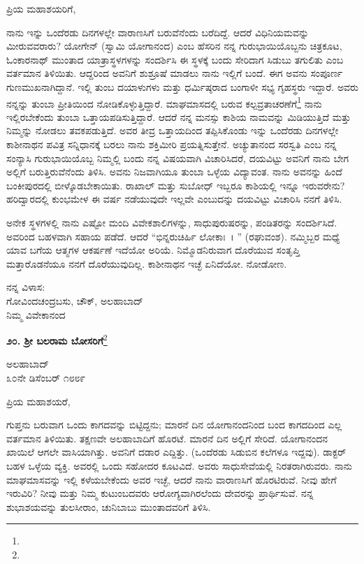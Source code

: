 \noindent
ಪ್ರಿಯ ಮಹಾಶಯರಿಗೆ,

ನಾನು ಇನ್ನು ಒಂದೆರಡು ದಿನಗಳಲ್ಲೇ ವಾರಾಣಸಿಗೆ ಬರುವೆನೆಂದು ಬರೆದಿದ್ದೆ. ಆದರೆ ವಿಧಿನಿಯಮವನ್ನು ಮೀರುವವರಾರು? ಯೋಗೇನ್ (ಸ್ವಾಮಿ ಯೋಗಾನಂದ) ಎಂಬ ಹೆಸರಿನ ನನ್ನ ಗುರುಭಾಯಿಯೊಬ್ಬನು ಚಿತ್ರಕೂಟ, ಓಂಕಾರನಾಥ್ ಮುಂತಾದ ಯಾತ್ರಾಸ್ಥಳಗಳನ್ನು ಸಂದರ್ಶಿಸಿ ಈ ಸ್ಥಳಕ್ಕೆ ಬಂದು ಸೇರಿದಾಗ ಸಿಡುಬು ತಗುಲಿತು ಎಂಬ ವರ್ತಮಾನ ತಿಳಿಯಿತು. ಆದ್ದರಿಂದ ಅವನಿಗೆ ಶುಶ್ರೂಷೆ ಮಾಡಲು ನಾನು ಇಲ್ಲಿಗೆ ಬಂದೆ. ಈಗ ಅವನು ಸಂಪೂರ್ಣ ಗುಣಮುಖನಾಗಿದ್ದಾನೆ. ಇಲ್ಲಿ ತುಂಬ ದಯಾಳುಗಳು ಮತ್ತು ಧರ್ಮಿಷ್ಠರಾದ ಬಂಗಾಳೀ ಸಭ್ಯ ಗೃಹಸ್ಥರು ಇದ್ದಾರೆ. ಅವರು ನನ್ನನ್ನು ತುಂಬಾ ಪ್ರೀತಿಯಿಂದ ನೋಡಿಕೊಳ್ಳುತ್ತಿದ್ದಾರೆ. ಮಾಘಮಾಸದಲ್ಲಿ ಬರುವ ಕಲ್ಪವ್ರತಾಚರಣೆಗೆ\footnote{} ನಾನು ಇಲ್ಲಿರಬೇಕೆಂದು ತುಂಬಾ ಒತ್ತಾಯಪಡಿಸುತ್ತಿದ್ದಾರೆ. ಆದರೆ ನನ್ನ ಮನಸ್ಸು ಕಾಶಿಯ ನಾಮವನ್ನು ಮಿಡಿಯುತ್ತಿದೆ ಮತ್ತು ನಿಮ್ಮನ್ನು ನೋಡಲು ತವಕಪಡುತ್ತಿದೆ. ಅವರ ತೀವ್ರ ಒತ್ತಾಯದಿಂದ ತಪ್ಪಿಸಿಕೊಂಡು ಇನ್ನು ಒಂದೆರಡು ದಿನಗಳಲ್ಲೇ ಕಾಶೀನಾಥನ ಪವಿತ್ರ ಸನ್ನಿಧಾನಕ್ಕೆ ಬರಲು ನಾನು ಶಕ್ತಿಮೀರಿ ಪ್ರಯತ್ನಿಸುತ್ತೇನೆ. ಅಚ್ಯುತಾನಂದ ಸರಸ್ವತಿ ಎಂಬ ನನ್ನ ಸಂನ್ಯಾಸಿ ಗುರುಭಾಯಿಯೊಬ್ಬ ನಿಮ್ಮಲ್ಲಿ ಬಂದು ನನ್ನ ವಿಷಯವಾಗಿ ವಿಚಾರಿಸಿದರೆ, ದಯವಿಟ್ಟು ಅವನಿಗೆ ನಾನು ಬೇಗ ಅಲ್ಲಿಗೆ ಬರುತ್ತಿರುವೆನೆಂದು ತಿಳಿಸಿ. ಅವನು ನಿಜವಾಗಿಯೂ ತುಂಬಾ ಒಳ್ಳೆಯ ವಿದ್ಯಾವಂತ. ನಾನು ಅವನನ್ನು ಹಿಂದೆ ಬಂಕೀಪುರದಲ್ಲಿ ಬೀಳ್ಕೊಡಬೇಕಾಯಿತು. ರಾಖಾಲ್ ಮತ್ತು ಸುಬೋಧ್ ಇಬ್ಬರೂ ಕಾಶಿಯಲ್ಲಿ ಇನ್ನೂ ಇರುವರೇನು?ಹರಿದ್ವಾರದಲ್ಲಿ ಕುಂಭಮೇಳ ಈ ವರ್ಷ ನಡೆಯುವುದೇ ಇಲ್ಲವೇ ಎಂಬುದನ್ನು ದಯವಿಟ್ಟು ವಿಚಾರಿಸಿ ನನಗೆ ತಿಳಿಸಿ.

ಅನೇಕ ಸ್ಥಳಗಳಲ್ಲಿ ನಾನು ಎಷ್ಟೋ ಮಂದಿ ವಿವೇಕಶಾಲಿಗಳನ್ನು, ಸಾಧುಪುರುಷರನ್ನು, ಪಂಡಿತರನ್ನು ಸಂದರ್ಶಿಸಿದೆ. ಅವರಿಂದ ಬಹಳವಾಗಿ ಸಹಾಯ ಪಡೆದೆ. ಆದರೆ “ಭಿನ್ನರುಚಿರ್ಹಿ ಲೋಕಾಃ~। ” (ರಘುವಂಶ). ನಮ್ಮಿಬ್ಬರ ಮಧ್ಯೆ ಯಾವ ಬಗೆಯ ಆತ್ಮಗಳ ಆಕರ್ಷಣೆ ಇದೆಯೋ ಅರಿಯೆ. ನಿಮ್ಮೊಡನಿರುವಾಗ ದೊರೆಯುವ ಸಂತೃಪ್ತಿ ಮತ್ತಾರೊಡನೆಯೂ ನನಗೆ ದೊರೆಯುವುದಿಲ್ಲ. ಕಾಶೀನಾಥನ ಇಚ್ಛೆ ಏನಿದೆಯೋ. ನೋಡೋಣ.

\vspace{-0.3cm}

{\flushright
ನನ್ನ ವಿಳಾಸ:\\ ಗೋವಿಂದಚಂದ್ರಬಸು, ಚೌಕ್, ಅಲಹಾಬಾದ್\\ನಿಮ್ಮ ವಿವೇಕಾನಂದ\par}

\begin{center}
\textbf{೨೦. ಶ‍್ರೀ ಬಲರಾಮ ಬೋಸರಿಗೆ}\footnote{}
\end{center}

\vspace{-0.5cm}

\begin{flushright}
ಅಲಹಾಬಾದ್\\೩೦ನೇ ಡಿಸೆಂಬರ್ ೧೮೮೯
\end{flushright}

\noindent
ಪ್ರಿಯ ಮಹಾಶಯರೆ,

ಗುಪ್ತನು ಬರುವಾಗ ಒಂದು ಕಾಗದವನ್ನು ಬಿಟ್ಟಿದ್ದನು; ಮಾರನೆ ದಿನ ಯೋಗಾನಂದನಿಂದ ಬಂದ ಕಾಗದದಿಂದ ಎಲ್ಲ ವರ್ತಮಾನ ತಿಳಿಯಿತು. ತಕ್ಷಣವೇ ಅಲಹಾಬಾದಿಗೆ ಹೊರಟೆ. ಮಾರನೆ ದಿನ ಅಲ್ಲಿಗೆ ಸೇರಿದೆ. ಯೋಗಾನಂದನ ಖಾಯಿಲೆ ಆಗಲೇ ವಾಸಿಯಾಗಿತ್ತು. ಅವನಿಗೆ ದಡಾರ ಎದ್ದಿತ್ತು. (ಒಂದೆರಡು ಸಿಡುಬಿನ ಕಲೆಗಳೂ ಇದ್ದವು). ಡಾಕ್ಟರ್ ಬಹಳ ಒಳ್ಳೆಯ ವ್ಯಕ್ತಿ. ಅವರಲ್ಲಿ ಒಂದು ಸಹೋದರ ಕೂಟವಿದೆ. ಅವರು ಸಾಧುಸೇವೆಯಲ್ಲಿ ನಿರತರಾಗಿರುವರು. ನಾನು ಮಾಘಮಾಸವನ್ನು ಇಲ್ಲಿ ಕಳೆಯಬೇಕೆಂದು ಅವರ ಇಚ್ಛೆ, ಆದರೆ ನಾನು ವಾರಾಣಸಿಗೆ ಹೊರಟಿರುವೆ. ನೀವು ಹೇಗೆ ಇರುವಿರಿ? ನೀವು ಮತ್ತು ನಿಮ್ಮ ಕುಟುಂಬದವರು ಆರೋಗ್ಯವಾಗಿರಲೆಂದು ದೇವರನ್ನು ಪ್ರಾರ್ಥಿಸುವೆ. ನನ್ನ ಶುಭಾಶಯವನ್ನು ತುಲಸೀರಾಂ, ಚುನಿಬಾಬು ಮುಂತಾದವರಿಗೆ ತಿಳಿಸಿ.

